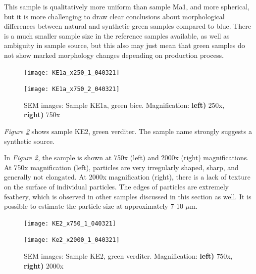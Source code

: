This sample is qualitatively more uniform than sample Ma1, and more spherical, but it is more challenging to draw clear conclusions about morphological differences between natural and synthetic green samples compared to blue. There is a much smaller sample size in the reference samples available, as well as ambiguity in sample source, but this also may just mean that green samples do not show marked morphology changes depending on production process.

\begin{figure}[H]
\centering
\begin{minipage}{.45\textwidth}
  \centering
  \texttt{[image: KE1a\_x250\_1\_040321]}
\end{minipage}
\begin{minipage}{.45\textwidth}
  \centering
  \texttt{[image: KE1a\_x750\_2\_040321]}
\end{minipage}
\caption[SEM images: Sample KE1a, green bice]{SEM images: Sample KE1a, green bice. Magnification: \textbf{left)} 250x, \textbf{right)} 750x}
\label{fig:KE1a_sem_1}
\end{figure}




\textit{Figure \ref{fig:KE2_sem_1}} shows sample KE2, green verditer. The sample name strongly suggests a synthetic source. 

In \textit{Figure \ref{fig:KE2_sem_1}}, the sample is shown at 750x (left) and 2000x (right) magnifications. At 750x magnification (left), particles are very irregularly shaped, sharp, and generally not elongated. At 2000x magnification (right), there is a lack of texture on the surface of individual particles. The edges of particles are extremely feathery, which is observed in other samples discussed in this section as well. It is possible to estimate the particle size at approximately 7-10 $\mu$m. 

\begin{figure}[H]
\centering
\begin{minipage}{.45\textwidth}
  \centering
  \texttt{[image: KE2\_x750\_1\_040321]}
\end{minipage}
\begin{minipage}{.45\textwidth}
  \centering
  \texttt{[image: Ke2\_x2000\_1\_040321]}
\end{minipage}
\caption[SEM images: Sample KE2, green verditer]{SEM images: Sample KE2, green verditer. Magnification: \textbf{left)} 750x, \textbf{right)} 2000x}
\label{fig:KE2_sem_1}
\end{figure}


